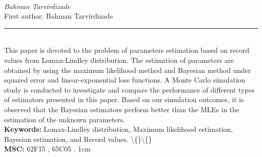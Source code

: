 \documentclass[10pt,twoside]{article}
\begin{document}
\noindent\begin{minipage}[t][\textheight]{\textwidth}
\\[0.35em]
{\itshape Bahman Tarvirdizade}\\[0.2em]
{\footnotesize First author: Bahman Tarvirdizade}\\[0.45em]
\noindent\rule{\textwidth}{0.3pt}\\[0.4em]
{\footnotesize  This paper is devoted to the problem of parameters estimation based on record values from Lomax-Lindley distribution. The estimation of parameters are obtained by using the maximum likelihood method and Bayesian method under squared error and linear-exponential loss functions. A Monte Carlo simulation study is conducted to investigate and compare the performance of different types of estimators presented in this paper. Based on our simulation outcomes, it is observed that the Bayesian estimators perform better than the MLEs in the estimation of the unknown parameters.}\\[0.4em]
{\footnotesize\bfseries Keywords:} {\footnotesize Lomax-Lindley distribution, Maximum likelihood estimation, Bayesian estimation, and Record values. \textbackslash\{\}\textbackslash\{\}}\\[0.15em]
{\footnotesize\bfseries MSC:} {\footnotesize 62F15 , 65C05 . 1cm}\\
\vfill
\end{minipage}
\newpage
\end{document}
